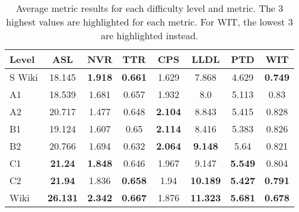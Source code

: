 \begin{table*}[ht]
    \centering
    \begin{tabular}{lccccccc}
        \hline
        \textbf{Level} &       \textbf{ASL} &      \textbf{NVR} &      \textbf{TTR} &      \textbf{CPS} &      \textbf{LLDL} &      \textbf{PTD} &      \textbf{WIT} \\
        \hline
        S Wiki &  18.145            &  \textbf{1.918}   &  \textbf{0.661}   &  1.629            &   7.868           &  4.629            &  \textbf{0.749} \\
        \hline
        A1     &  18.539            &  1.681            &  0.657            &  1.932            &     8.0           &  5.113            &           0.83 \\
        \hline
        A2     &  20.717            &  1.477            &  0.648            &  \textbf{2.104}   &   8.843           &  5.415            &           0.828 \\
        \hline
        B1     &  19.124            &  1.607            &   0.65            &  \textbf{2.114}   &   8.416           &  5.383            &           0.826 \\
        \hline
        B2     &  20.766            &  1.694            &  0.632            &  \textbf{2.064}   &   \textbf{9.148}  &   5.64            &           0.821 \\
        \hline
        C1     &  \textbf{21.24}    &  \textbf{1.848}   &  0.646            &  1.967            &   9.147           &  \textbf{5.549}   &           0.804 \\
        \hline
        C2     &  \textbf{21.94}    &  1.836            &  \textbf{0.658}   &   1.94            &  \textbf{10.189}  &  \textbf{5.427}   &  \textbf{0.791} \\
        \hline
        Wiki   &  \textbf{26.131}   &  \textbf{2.342}   &  \textbf{0.667}   &  1.876            &  \textbf{11.323}  &  \textbf{5.681}   &  \textbf{0.678} \\
        \hline
    \end{tabular}
    \caption{
        \centering
        Average metric results for each difficulty level and metric. The 3 highest values are highlighted for each metric. For WIT, the lowest 3 are highlighted instead.
    }
    \label{tab:means}
\end{table*}